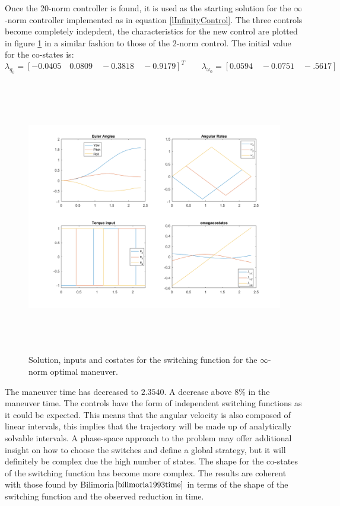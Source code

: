 Once the 20-norm controller is found, it is used as the starting solution for the $\infty$-norm controller implemented as in equation \ref{lInfinityControl}. The three controls become completely indepdent, the characteristics for the new control are plotted in figure \ref{fig:lInftyManeuver} in a similar fashion to those of the 2-norm control. The initial value for the co-states is:
\begin{equation}
\lambda_{q_0} = [-0.0405 \quad 0.0809 \quad -0.3818 \quad -0.9179]^T \qquad
\lambda_{\omega_0} = [0.0594 \quad -0.0751 \quad -.5617]
\end{equation}

\begin{figure}[H]
	\centering
	\includegraphics[height=12cm,keepaspectratio]{media/lInftyManeuver.png}
	\caption{Solution, inputs and costates for the switching function for the $\infty$-norm optimal maneuver.}
	\label{fig:lInftyManeuver}
\end{figure}

The maneuver time has decreased to $2.3540$. A decrease above 8\% in the maneuver time. The controls have the form of independent switching functions as it could be expected. This means that the angular velocity is also composed of linear intervals, this implies that the trajectory will be made up of analytically solvable intervals. A phase-space approach to the problem may offer additional insight on how to choose the switches and define a global strategy, but it will definitely be complex due the high number of states. The shape for the co-states of the switching function has become more complex. The results are coherent with those found by Bilimoria$\cite{bilimoria1993time}$ in terms of the shape of the switching function and the observed reduction in time.

